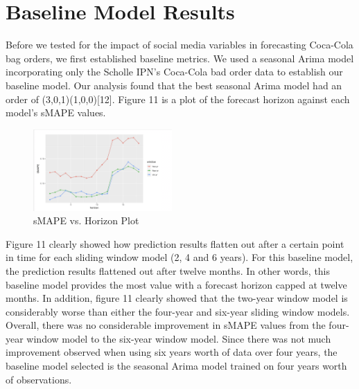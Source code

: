 \documentclass[12pt,oneside]{chicagocapstone}
\begin{document}
\hypertarget{baseline-model-results}{%
\section*{Baseline Model Results}\label{baseline-model-results}}

Before we tested for the impact of social media variables in forecasting Coca-Cola bag orders, we first established baseline metrics. We used a seasonal Arima model incorporating only the Scholle IPN's Coca-Cola bad order data to establish our baseline model. Our analysis found that the best seasonal Arima model had an order of (3,0,1)(1,0,0){[}12{]}. Figure 11 is a plot of the forecast horizon against each model's sMAPE values.
\begin{figure}

{\centering \includegraphics[width=200px,angle = 0, scale=2.1]{figure/SMAPEvsHorizon} 

}

\caption{sMAPE vs. Horizon Plot}\label{fig:SMAPEvsHorizon}
\end{figure}
Figure 11 clearly showed how prediction results flatten out after a certain point in time for each sliding window model (2, 4 and 6 years). For this baseline model, the prediction results flattened out after twelve months. In other words, this baseline model provides the most value with a forecast horizon capped at twelve months. In addition, figure 11 clearly showed that the two-year window model is considerably worse than either the four-year and six-year sliding window models. Overall, there was no considerable improvement in sMAPE values from the four-year window model to the six-year window model. Since there was not much improvement observed when using six years worth of data over four years, the baseline model selected is the seasonal Arima model trained on four years worth of observations.
\end{document}
